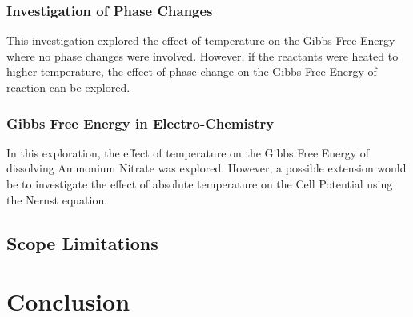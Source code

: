 \documentclass{article}
\begin{document}
\subsubsection{Investigation of Phase Changes}
This investigation explored the effect of temperature on the Gibbs Free Energy where no phase changes were involved. However, if the reactants were heated to higher temperature, the effect of phase change on the Gibbs Free Energy of reaction can be explored.

\subsubsection{Gibbs Free Energy in Electro-Chemistry}
In this exploration, the effect of temperature on the Gibbs Free Energy of dissolving Ammonium Nitrate was explored. However, a possible extension would be to investigate the effect of absolute temperature on the Cell Potential using the Nernst equation.

\subsection{Scope Limitations}


\section{Conclusion}
\end{document}
